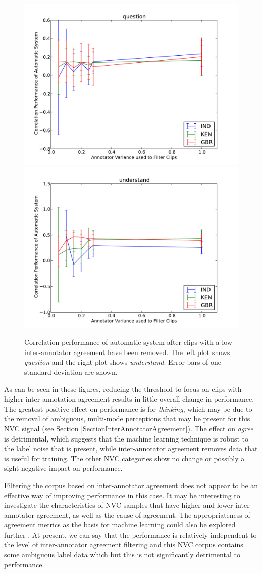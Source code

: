 \begin{figure}
\centering
\includegraphics[width = 0.49 \columnwidth]{nvcregression/interannotator/clipfilterperf-question.pdf}
\includegraphics[width = 0.49 \columnwidth]{nvcregression/interannotator/clipfilterperf-understand.pdf}
\caption[Correlation performance of automatic system after clips with a low inter-annotator agreement have been removed.]{Correlation performance of automatic system after clips with a low inter-annotator agreement have been removed. The left plot shows \textit{question} and the right plot shows \textit{understand}. Error bars of one standard deviation are shown.}
\label{FigureInterannotatorFilteredPerformanceB}
\end{figure}

As can be seen in these figures, reducing the threshold to focus on clips with higher inter-annotation agreement results in little overall change in performance. The greatest positive effect on performance is for \textit{thinking}, which may be due to the removal of ambiguous, multi-mode perceptions that may be present for this \ac{NVC} signal (see Section \ref{SectionInterAnnotatorAgreement}). The effect on \textit{agree} is detrimental, which suggests that the machine learning technique is robust to the label noise that is present, while inter-annotator agreement removes data that is useful for training. The other \ac{NVC} categories show no change or possibly a sight negative impact on performance.

Filtering the corpus based on inter-annotator agreement does not appear to be an effective way of improving performance in this case. It may be interesting to investigate the characteristics of \ac{NVC} samples that have higher and lower inter-annotator agreement, as well as the cause of agreement. The appropriateness of agreement metrics as the basis for machine learning could also be explored further \cite{Reidsma2008Thesis}. At present, we can say that the performance is relatively independent to the level of inter-annotator agreement filtering and this \ac{NVC} corpus contains some ambiguous label data which but this is not significantly detrimental to performance.

